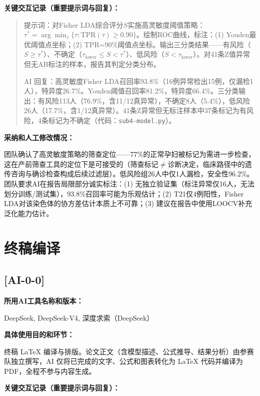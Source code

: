 \documentclass[12pt,a4paper]{ctexart}
\begin{document}
\textbf{关键交互记录（重要提示词与回复）：}

\begin{quote}
提示词：对Fisher LDA综合评分$S$实施高灵敏度阈值策略：$\tau^*=\arg\min_\tau\{\tau:\text{TPR}(\tau)\geq0.90\}$。绘制ROC曲线，标注：(1) Youden最优阈值点坐标；(2) TPR=90\%阈值点坐标。输出三分类结果——有风险（$S\geq\tau^*$）、不确定（$\tau_{\text{lower}}\leq S<\tau^*$）、低风险（$S<\tau_{\text{lower}}$）。对41条Z值异常但无AB标注的样本，报告其判定分类分布。

AI 回复：高灵敏度Fisher LDA召回率93.8\%（16例异常检出15例，仅漏检1人），特异度26.7\%。Youden阈值召回率81.2\%，特异度66.4\%。三分类输出：有风险113人（76.9\%，含11/12真异常），不确定8人（5.4\%），低风险26人（17.7\%，含1/12真异常）。41条Z异常但无标注样本中37条标记为有风险，4条标记为不确定（代码：\texttt{sub4-model.py}）。
\end{quote}

\textbf{采纳和人工修改情况：}

团队确认了高灵敏度策略的筛查定位——77\%的正常孕妇被标记为需进一步检查，这在产前筛查工具的定位下是可接受的（筛查标记$\neq$诊断决定，临床路径中的遗传咨询与确诊检查构成后续过滤层）。低风险组26人中仅1人漏检，安全性96.2\%。团队要求AI在报告局限部分诚实标注：(1) 无独立验证集（标注异常仅16人，无法划分训练/测试集），93.8\%召回率可能为乐观估计；(2) T21仅4例阳性，Fisher LDA对该染色体的协方差估计本质上不可靠；(3) 建议在报告中使用LOOCV补充泛化能力估计。

\section*{终稿编译}

\subsection*{[AI-0-0]}

\textbf{所用AI工具名称和版本：}

DeepSeek, DeepSeek-V4, 深度求索（DeepSeek）

\textbf{具体使用目的和环节：}

终稿 LaTeX 编译与排版。论文正文（含模型描述、公式推导、结果分析）由参赛队独立撰写，AI 仅将已完成的文字、公式和图表转化为 LaTeX 代码并编译为 PDF，全程不参与内容生成。

\textbf{关键交互记录（重要提示词与回复）：}
\end{document}
